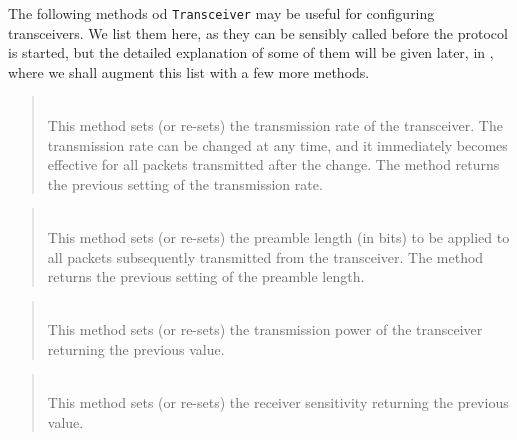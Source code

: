 The following methods od {\tt Transceiver} may be useful for configuring
transceivers.
We list them here,
as they can be sensibly called before the protocol is started,
but the detailed explanation of some of them will be given later, in
, where we shall augment this list with a few more methods.

\begin{quote}
\noindent{} \hspace{0in}\vspace{0.05in}\\
\noindent
This method sets (or re-sets) the transmission rate of the transceiver.
The transmission rate can be changed at any time, and it immediately
becomes effective for all packets transmitted after the change.
The method returns the previous setting of the transmission rate.
\end{quote}

\begin{quote}
\noindent{} \hspace{0in}\vspace{0.05in}\\
\noindent
This method sets (or re-sets) the preamble length (in bits)
to be applied to all
packets subsequently transmitted from the transceiver.
The method returns the previous setting of the preamble length.
\end{quote}

\begin{quote}
\noindent{} \hspace{0in}\vspace{0.05in}\\
\noindent
This method sets (or re-sets) the transmission power of the transceiver
returning the previous value.
\end{quote}

\begin{quote}
\noindent{} \hspace{0in}\vspace{0.05in}\\
\noindent
This method sets (or re-sets) the receiver sensitivity
returning the previous value.
\end{quote}


